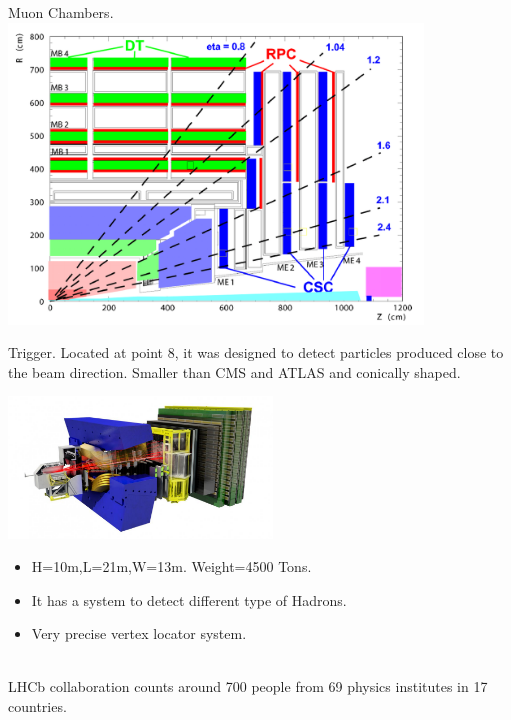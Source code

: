 \documentclass[8pt]{beamer}
\begin{document}
\begin{frame}[fragile]{Muon Chambers.}
	\includegraphics[width=11cm]{16}
\end{frame}
\begin{frame}[fragile]{Trigger.}
	Located at point 8, it was designed to detect particles produced close to the beam direction.
	Smaller than CMS and ATLAS and conically shaped.
	
	\vspace{0.5cm}
	\begin{minipage}{0.7\textwidth}%
		\includegraphics[width=7cm]{8}
	\end{minipage}%
	\hfill%
	\begin{minipage}{0.3\textwidth}\raggedleft
		\begin{itemize}
			\item H=10m,L=21m,W=13m. Weight=4500 Tons.		
			\item It has a system to detect different type of Hadrons.
			\item Very precise vertex locator system.
			
		\end{itemize}
	\end{minipage}
	\\
	\vspace{0.5cm}
	LHCb collaboration counts around 700 people from 69 physics institutes in 17 countries.
\end{frame}
\end{document}

